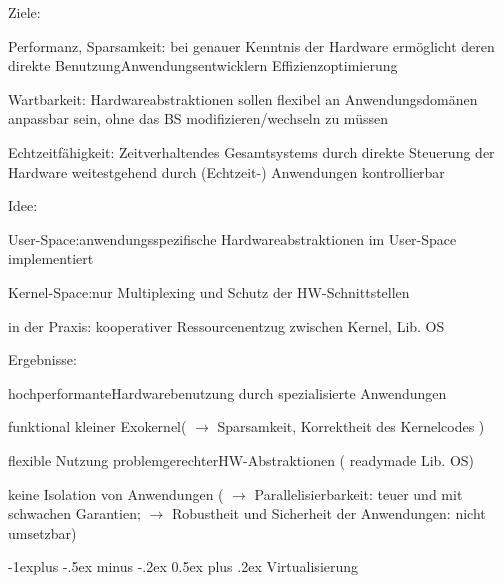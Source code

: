 \documentclass[a4paper]{article}
\makeatletter
\renewcommand{\subsection}{\@startsection{subsection}{2}{0mm}%
 {-1explus -.5ex minus -.2ex}%
 {0.5ex plus .2ex}%
 {\normalfont\normalsize\bfseries}}
\makeatother
\begin{document}
\begin{multicols}{3}
    \begin{itemize*}
        \item Ziele:
        \begin{itemize*}
            \item Performanz, Sparsamkeit: bei genauer Kenntnis der Hardware ermöglicht deren direkte BenutzungAnwendungsentwicklern Effizienzoptimierung
            \item Wartbarkeit: Hardwareabstraktionen sollen flexibel an Anwendungsdomänen anpassbar sein, ohne das BS modifizieren/wechseln zu müssen
            \item Echtzeitfähigkeit: Zeitverhaltendes Gesamtsystems durch direkte Steuerung der Hardware weitestgehend durch (Echtzeit-) Anwendungen kontrollierbar
        \end{itemize*}
        \item Idee:
        \begin{itemize*}
            \item User-Space:anwendungsspezifische Hardwareabstraktionen im User-Space implementiert
            \item Kernel-Space:nur Multiplexing und Schutz der HW-Schnittstellen
            \item in der Praxis: kooperativer Ressourcenentzug zwischen Kernel, Lib. OS
        \end{itemize*}
        \item Ergebnisse:
        \begin{itemize*}
            \item hochperformanteHardwarebenutzung durch spezialisierte Anwendungen
            \item funktional kleiner Exokernel( $\rightarrow$ Sparsamkeit, Korrektheit des Kernelcodes )
            \item flexible Nutzung problemgerechterHW-Abstraktionen ( readymade Lib. OS)
            \item keine Isolation von Anwendungen ( $\rightarrow$ Parallelisierbarkeit: teuer und mit schwachen Garantien; $\rightarrow$ Robustheit und Sicherheit der Anwendungen: nicht umsetzbar)
        \end{itemize*}
    \end{itemize*}


    \subsection{Virtualisierung}


\end{multicols}
\end{document}
